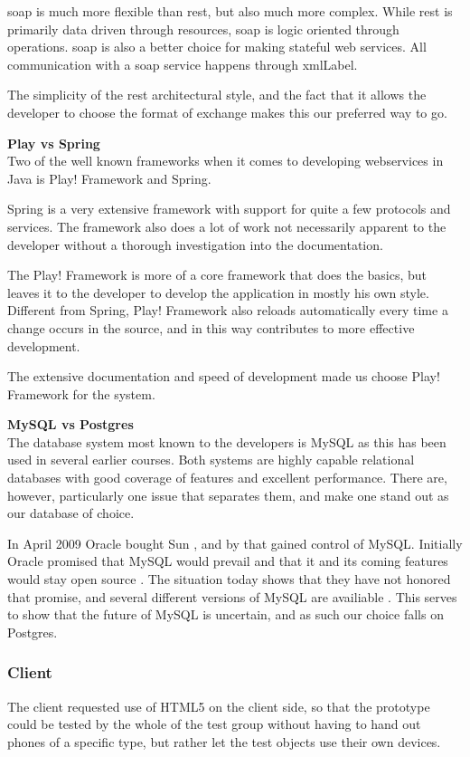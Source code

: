 \documentclass[11pt]{book}
\begin{document}
\gls{soap} is much more flexible than \gls{rest}, but also much more complex. While \gls{rest} is primarily data driven through resources, \gls{soap} is logic oriented through operations. \gls{soap} is also a better choice for making stateful web services. All communication with a \gls{soap} service happens through \gls{xmlLabel}.

The simplicity of the \gls{rest} architectural style, and the fact that it allows the developer to choose the format of exchange makes this our preferred way to go.

\textbf{Play vs Spring}\\
Two of the well known frameworks when it comes to developing webservices in Java is Play! Framework and Spring. %

Spring is a very extensive framework with support for quite a few protocols and services. The framework also does a lot of work not necessarily apparent to the developer without a thorough investigation into the documentation.

The Play! Framework is more of a core framework that does the basics, but leaves it to the developer to develop the application in mostly his own style. Different from Spring, Play! Framework also reloads automatically every time a change occurs in the source, and in this way contributes to more effective development.

The extensive documentation and speed of development made us choose Play! Framework for the system.

\textbf{MySQL vs Postgres}\\
The database system most known to the developers is MySQL as this has been used in several earlier courses. Both systems are highly capable relational databases with good coverage of features and excellent performance. There are, however, particularly one issue that separates them, and make one stand out as our database of choice.

In April 2009 Oracle bought Sun \cite{sun}, and by that gained control of MySQL. Initially Oracle promised that MySQL would prevail and that it and its coming features would stay open source \cite{mysql}. The situation today shows that they have not honored that promise, and several different versions of MySQL are availiable \cite{mysqlproducts}. This serves to show that the future of MySQL is uncertain, and as such our choice falls on Postgres.

\subsubsection{Client}
The client requested use of HTML5 on the client side, so that the prototype could be tested by the whole of the test group without having to hand out phones of a specific type, but rather let the test objects use their own devices.
\end{document}
